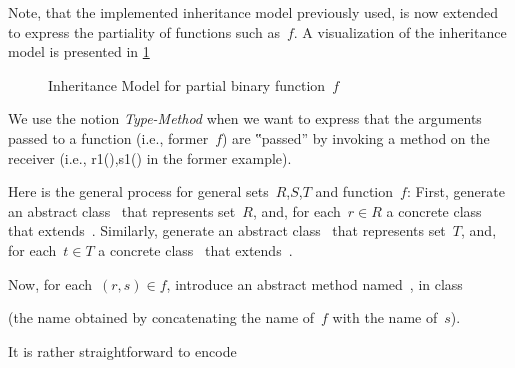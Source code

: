 Note, that the implemented inheritance model previously used, is now extended to express the partiality
  of functions such as~$f$. A visualization of the inheritance model is presented in \cref{Figure:partial:inheritance:model}

\begin{figure}[ht]
  \label{Figure:partial:inheritance:model}
  \caption{Inheritance Model for partial binary function~$f$}
  \begin{adjustbox}{max width=0.6\linewidth}
    
  \end{adjustbox}
\end{figure}

We use the notion \emph{Type-Method} when we want to express that the arguments passed to a function
  (i.e., former~$f$) are ‟passed” by invoking a method on the receiver (i.e., r1(),s1() in the former example).

Here is the general process for general sets~$R$,$S$,$T$ and function~$f$:
First, generate an abstract class~ that represents set~$R$, and,
  for each~$r∈R$ a concrete class~ that extends~.
Similarly, generate an abstract class~ that represents set~$T$, and,
  for each~$t∈T$ a concrete class~ that extends~.

Now, for each~$(r,s)∈f$, introduce an abstract method named~,
  in class~

(the name obtained by
  concatenating the name of~$f$ with the name of~$s$).

It is rather straightforward to encode
